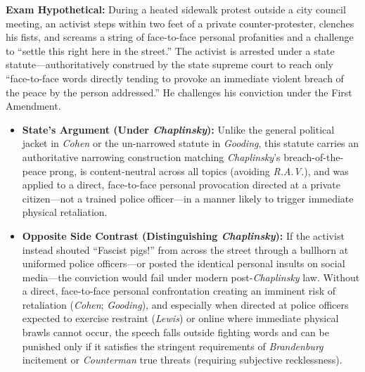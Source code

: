 \documentclass[12pt]{article}
\begin{document}
\textbf{Exam Hypothetical:} During a heated sidewalk protest outside a city council meeting, an activist steps within two feet of a private counter-protester, clenches his fists, and screams a string of face-to-face personal profanities and a challenge to ``settle this right here in the street.'' The activist is arrested under a state statute---authoritatively construed by the state supreme court to reach only ``face-to-face words directly tending to provoke an immediate violent breach of the peace by the person addressed.'' He challenges his conviction under the First Amendment.
\begin{itemize}
  \item \textbf{State's Argument (Under \textit{Chaplinsky}):} Unlike the general political jacket in \textit{Cohen} or the un-narrowed statute in \textit{Gooding}, this statute carries an authoritative narrowing construction matching \textit{Chaplinsky}'s breach-of-the-peace prong, is content-neutral across all topics (avoiding \textit{R.A.V.}), and was applied to a direct, face-to-face personal provocation directed at a private citizen---not a trained police officer---in a manner likely to trigger immediate physical retaliation.
  \item \textbf{Opposite Side Contrast (Distinguishing \textit{Chaplinsky}):} If the activist instead shouted ``Fascist pigs!'' from across the street through a bullhorn at uniformed police officers---or posted the identical personal insults on social media---the conviction would fail under modern post-\textit{Chaplinsky} law. Without a direct, face-to-face personal confrontation creating an imminent risk of retaliation (\textit{Cohen}; \textit{Gooding}), and especially when directed at police officers expected to exercise restraint (\textit{Lewis}) or online where immediate physical brawls cannot occur, the speech falls outside fighting words and can be punished only if it satisfies the stringent requirements of \textit{Brandenburg} incitement or \textit{Counterman} true threats (requiring subjective recklessness).
\end{itemize}
\end{document}

